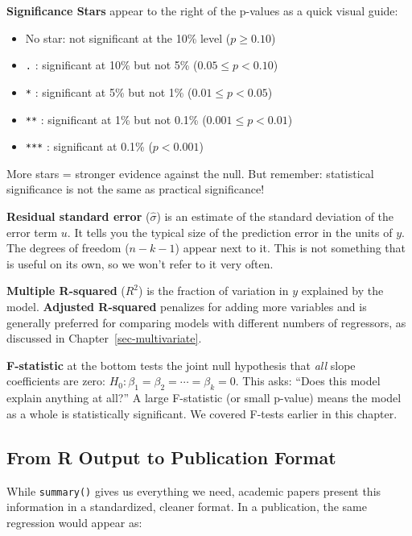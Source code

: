 \documentclass[
  letterpaper,
  DIV=11,
  numbers=noendperiod]{scrreprt}
\providecommand{\tightlist}{%
  \setlength{\itemsep}{0pt}\setlength{\parskip}{0pt}}
\begin{document}
\textbf{Significance Stars} appear to the right of the p-values as a
quick visual guide:

\begin{itemize}
\tightlist
\item
  No star: not significant at the 10\% level (\(p \geq 0.10\))
\item
  \texttt{.} : significant at 10\% but not 5\% (\(0.05 \leq p < 0.10\))
\item
  \texttt{*} : significant at 5\% but not 1\% (\(0.01 \leq p < 0.05\))
\item
  \texttt{**} : significant at 1\% but not 0.1\%
  (\(0.001 \leq p < 0.01\))
\item
  \texttt{***} : significant at 0.1\% (\(p < 0.001\))
\end{itemize}

More stars = stronger evidence against the null. But remember:
statistical significance is not the same as practical significance!

\textbf{Residual standard error} (\(\hat{\sigma}\)) is an estimate of
the standard deviation of the error term \(u\). It tells you the typical
size of the prediction error in the units of \(y\). The degrees of
freedom (\(n - k - 1\)) appear next to it. This is not something that is
useful on its own, so we won't refer to it very often.

\textbf{Multiple R-squared} (\(R^2\)) is the fraction of variation in
\(y\) explained by the model. \textbf{Adjusted R-squared} penalizes for
adding more variables and is generally preferred for comparing models
with different numbers of regressors, as discussed in
Chapter~\ref{sec-multivariate}.

\textbf{F-statistic} at the bottom tests the joint null hypothesis that
\emph{all} slope coefficients are zero:
\(H_0: \beta_1 = \beta_2 = \cdots = \beta_k = 0\). This asks: ``Does
this model explain anything at all?'' A large F-statistic (or small
p-value) means the model as a whole is statistically significant. We
covered F-tests earlier in this chapter.

\subsection{From R Output to Publication
Format}\label{from-r-output-to-publication-format}

While \texttt{summary()} gives us everything we need, academic papers
present this information in a standardized, cleaner format. In a
publication, the same regression would appear as:
\end{document}
